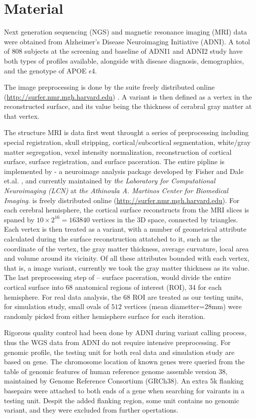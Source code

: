 \section{Material}
Next generation sequencing (NGS) and magnetic resonance imaging (MRI) data were obtained from Alzheimer’s Disease Neuroimaging Initiative (ADNI). A totol of 808 subjects at the screening and baseline of ADNI1 and ADNI2 study have both types of profiles available, alongside with disease diagnosis, demographics, and the genotype of APOE $\epsilon$4.

The image preprocessing is done by the \FS suite freely distributed online (\url{http://surfer.nmr.mgh.harvard.edu}) \cite{FS:Intro}. A variant is then defined as a vertex in the reconstructed surface, and its value being the thickness of cerabral gray matter at that vertex. 

The structure MRI is data first went throught a series of preprocessing including special registration, skull stripping, cortical/subcortical segmentation, white/gray matter segregation, vexel intensity normalization, reconstruction of cortical surface, surface registration, and surface paceration. The entire pipline is implemented by \FS - a neuroimage analysis package developed by Fisher and Dale et.al. \cite{FS:Intro}, and currently maintained by \textit{the Laboratory for Computational Neuroimaging (LCN)}  at \textit {the Athinoula A. Martinos Center for Biomedical Imaging}. \FS is freely distributed online (\url{http://surfer.nmr.mgh.harvard.edu}). For each cerebral hemisphere, the cortical surface reconstructs from the MRI slices is spaned by $10\times2^16 = 163840$ vertices in the 3D space, connected by triangles. Each vertex is then treated as a variant, with a number of geometrical attribute calculated during the surface reconstruction attatched to it, such as the coordinate of the vertex, the gray matter thickness, average curvature, local area and volume around its vicinity. Of all these attributes bounded with each vertex, that is, a image variant, currently we took the gray matter thickness as its value. The last preprocessing step of \FS-- surface paceration, would divide the entire cortical surface into 68 anatomical regions of interest (ROI), 34 for each hemisphere. For real data analysis, the 68 ROI are treated as our testing units, for simulation study, small ovals of $512$ vertices (mean diametter=28mm) were randomly picked from either hemisphere surface for each iteration.

Rigorous quality control had been done by ADNI during variant calling process, thus the WGS data from ADNI do not require intensive preprocessing. For genomic profile, the testing unit for both real data and simulation study are based on gene. The chromosome location of known genes were queried from the table of genomic features of human reference genome assemble version 38, maintained by Genome Reference Consortium (GRCh38). An extra 5k flanking basepairs were attached to both ends of a gene when searching for vairants in a testing unit. Despit the added flanking region, some unit contains no genomic variant, and they were excluded from further opertations.